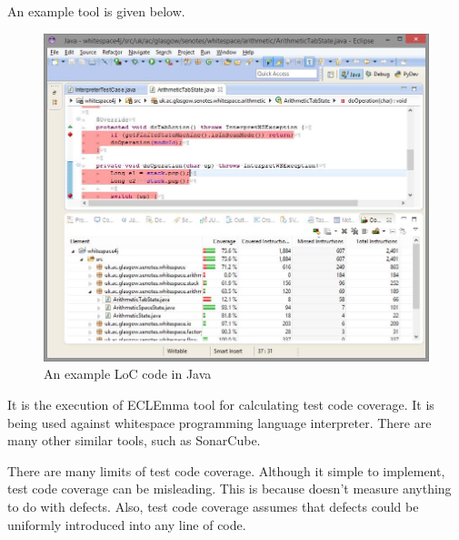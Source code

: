 \documentclass[a4paper, openany]{memoir}
\begin{document}
An example tool is given below.
\begin{figure}[H]
    \centering
    \includegraphics[scale=0.5]{src/12 Example tool.png}
    \caption{An example LoC code in Java}
\end{figure}
\noindent It is the execution of ECLEmma tool for calculating test code coverage. It is being used against whitespace programming language interpreter. There are many other similar tools, such as SonarCube.

There are many limits of test code coverage. Although it simple to implement, test code coverage can be misleading. This is because doesn't measure anything to do with defects. Also, test code coverage assumes that defects could be uniformly introduced into any line of code. 
\end{document}
